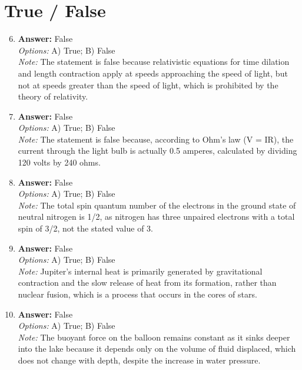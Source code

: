 \documentclass[12pt]{article}
\begin{document}
\section*{True / False}
\begin{enumerate}[label=\arabic*.]
\setcounter{enumi}{5}
\item \textbf{Answer:} False
\\ \textit{Options:} A) True; B) False
\\ \textit{Note:} The statement is false because relativistic equations for time dilation and length contraction apply at speeds approaching the speed of light, but not at speeds greater than the speed of light, which is prohibited by the theory of relativity.
\item \textbf{Answer:} False
\\ \textit{Options:} A) True; B) False
\\ \textit{Note:} The statement is false because, according to Ohm's law (V = IR), the current through the light bulb is actually 0.5 amperes, calculated by dividing 120 volts by 240 ohms.
\item \textbf{Answer:} False
\\ \textit{Options:} A) True; B) False
\\ \textit{Note:} The total spin quantum number of the electrons in the ground state of neutral nitrogen is 1/2, as nitrogen has three unpaired electrons with a total spin of 3/2, not the stated value of 3.
\item \textbf{Answer:} False
\\ \textit{Options:} A) True; B) False
\\ \textit{Note:} Jupiter's internal heat is primarily generated by gravitational contraction and the slow release of heat from its formation, rather than nuclear fusion, which is a process that occurs in the cores of stars.
\item \textbf{Answer:} False
\\ \textit{Options:} A) True; B) False
\\ \textit{Note:} The buoyant force on the balloon remains constant as it sinks deeper into the lake because it depends only on the volume of fluid displaced, which does not change with depth, despite the increase in water pressure.
\end{enumerate}
\end{document}
